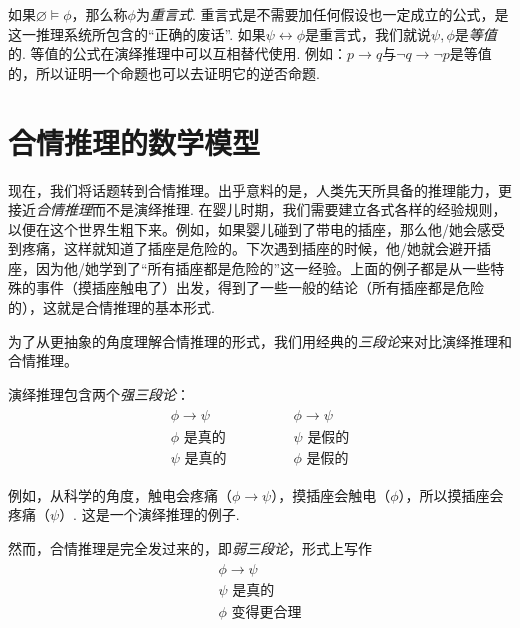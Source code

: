 如果$\varnothing\vDash \phi$，那么称$\phi$为\emph{重言式}. 重言式是不需要加任何假设也一定成立的公式，是这一推理系统所包含的“正确的废话”. 如果$\psi\leftrightarrow\phi$是重言式，我们就说$\psi,\phi$是\emph{等值}的. 等值的公式在演绎推理中可以互相替代使用. 例如：$p\to q$与$\neg q\to\neg p$是等值的，所以证明一个命题也可以去证明它的逆否命题.


\section{合情推理的数学模型}

现在，我们将话题转到合情推理。出乎意料的是，人类先天所具备的推理能力，更接近\emph{合情推理}而不是演绎推理. 在婴儿时期，我们需要建立各式各样的经验规则，以便在这个世界生粗下来。例如，如果婴儿碰到了带电的插座，那么他/她会感受到疼痛，这样就知道了插座是危险的。下次遇到插座的时候，他/她就会避开插座，因为他/她学到了“所有插座都是危险的”这一经验。上面的例子都是从一些特殊的事件（摸插座触电了）出发，得到了一些一般的结论（所有插座都是危险的），这就是合情推理的基本形式.

为了从更抽象的角度理解合情推理的形式，我们用经典的\emph{三段论}来对比演绎推理和合情推理。

演绎推理包含两个\emph{强三段论}：
    \[
        \begin{array}{c}
            \begin{array}{c}  
                \phi \to \psi \\ \phi\text{ 是真的} \\ \hline \psi\text{ 是真的}
            \end{array} 
            \qquad \qquad 
            \begin{array}{c}  
                \phi \to \psi \\ \psi\text{ 是假的} \\ \hline \phi\text{ 是假的}
            \end{array}
        \end{array} 
    \]

例如，从科学的角度，触电会疼痛（$\phi\to \psi$），摸插座会触电（$\phi$），所以摸插座会疼痛（$\psi$）. 这是一个演绎推理的例子.

然而，合情推理是完全发过来的，即\emph{弱三段论}，形式上写作 
        \[
        \begin{array}{c}
            \begin{array}{c}  
                \phi \to \psi \\ \psi\text{ 是真的} \\ \hline \phi\text{ 变得更合理}
            \end{array} 
        \end{array} 
    \]

